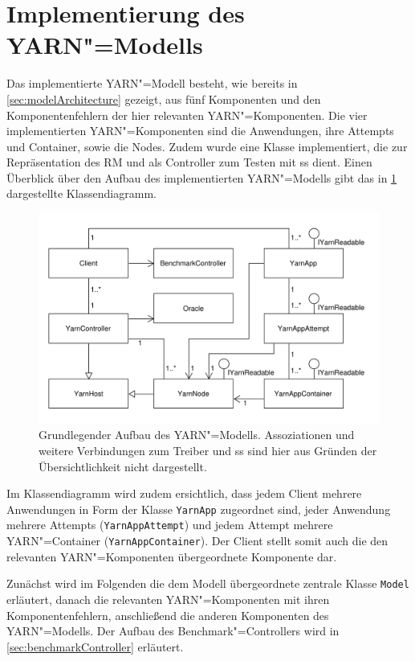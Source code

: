 \section{Implementierung des YARN"=Modells}
\label{sec:yarnModel}

Das implementierte YARN"=Modell besteht, wie bereits in \cref{sec:modelArchitecture} gezeigt, aus fünf Komponenten und den Komponentenfehlern der hier relevanten YARN"=Komponenten.
Die vier implementierten YARN"=Komponenten sind die Anwendungen, ihre Attempts und Container, sowie die Nodes.
Zudem wurde eine Klasse implementiert, die zur Repräsentation des \gls{RM} und als Controller zum Testen mit \gls{ss} dient.
Einen Überblick über den Aufbau des implementierten YARN"=Modells gibt das in \cref{fig:yarnModelClassDiagram} dargestellte Klassendiagramm.

\begin{figure}
    \includegraphics{./resources/yarnModel_ls_MA.pdf}
    \caption[Grundlegender Aufbau des YARN"=Modells]
        {Grundlegender Aufbau des YARN"=Modells.
        Assoziationen und weitere Verbindungen zum Treiber und \acrshort{ss} sind hier aus Gründen der Übersichtlichkeit nicht dargestellt.}
    \label{fig:yarnModelClassDiagram}
\end{figure}

Im Klassendiagramm wird zudem ersichtlich, dass jedem Client mehrere Anwendungen in Form der Klasse \texttt{YarnApp} zugeordnet sind, jeder Anwendung mehrere Attempts (\texttt{YarnAppAttempt}) und jedem Attempt mehrere YARN"=Container (\texttt{YarnAppContainer}).
Der Client stellt somit auch die den relevanten YARN"=Komponenten übergeordnete Komponente dar.

Zunächst wird im Folgenden die dem Modell übergeordnete zentrale Klasse \texttt{Model} erläutert, danach die relevanten YARN"=Komponenten mit ihren Komponentenfehlern, anschließend die anderen Komponenten des YARN"=Modells.
Der Aufbau des Benchmark"=Controllers wird in \cref{sec:benchmarkController} erläutert.

